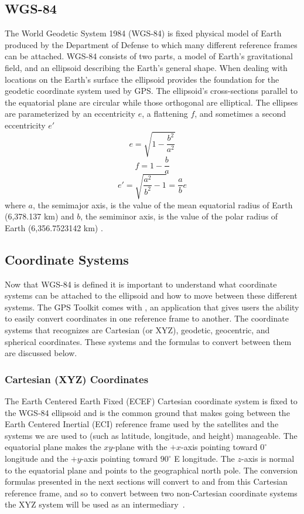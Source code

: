 \subsection{WGS-84}
The World Geodetic System 1984 (WGS-84) is fixed physical model of Earth produced by the Department of Defense to which many different reference frames can be attached. WGS-84 consists of two parts, a model of Earth's gravitational field, and an ellipsoid describing the Earth's general shape. When dealing with locations on the Earth's surface the ellipsoid provides the foundation for the geodetic coordinate system used by GPS. The ellipsoid's cross-sections parallel to the equatorial plane are circular while those orthogonal are elliptical. The ellipses are parameterized by an eccentricity $e$, a flattening $f$, and sometimes a second eccentricity $e'$
\[e=\sqrt{1-\frac{b^{2}}{a^{2}}}\]
\[f=1-\frac{b}{a}\]
\[e'=\sqrt{\frac{a^{2}}{b^{2}}-1}=\frac{a}{b}e\]
where $a$, the semimajor axis, is the value of the mean equatorial radius of Earth (6,378.137 km) and $b$, the semiminor axis, is the value of the polar radius of Earth (6,356.7523142 km) \cite[pp. 25-26]{kaplan:ugpspa}.
\subsection{Coordinate Systems}
Now that WGS-84 is defined it is important to understand what coordinate systems can be attached to the ellipsoid and how to move between these different systems. The GPS Toolkit comes with , an application that gives users the ability to easily convert coordinates in one reference frame to another. The coordinate 
systems that  recognizes are Cartesian (or XYZ), geodetic, geocentric, and spherical coordinates. These systems and the formulas to convert between them are discussed below.
\subsubsection{Cartesian (XYZ) Coordinates}
The Earth Centered Earth Fixed (ECEF) Cartesian coordinate system is fixed to the WGS-84 ellipsoid and is the common ground that makes going between the Earth Centered Inertial (ECI) reference frame used by the satellites and the systems we are used to (such as latitude, longitude, and height) manageable. The equatorial plane makes the $xy$-plane with the $+x$-axis pointing toward $0^{\circ}$ longitude and the $+y$-axis pointing toward $90^{\circ}$ E longitude. The $z$-axis is normal to the equatorial plane and points to the geographical north pole. The conversion formulas presented in the next sections will convert to and from this Cartesian reference frame, and so to convert between two non-Cartesian coordinate systems the XYZ system will be used as an intermediary~\cite[p. 24]{kaplan:ugpspa}.
